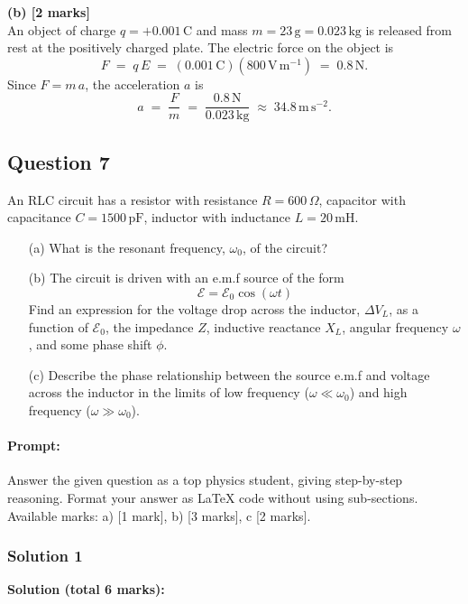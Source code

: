 \documentclass{article}
\begin{document}
\textbf{(b) [2 marks]}\\
An object of charge \(q = +0.001\,\mathrm{C}\) and mass \(m = 23\,\mathrm{g} 
= 0.023\,\mathrm{kg}\) is released from rest at the positively charged plate.  
The electric force on the object is
\[
F \;=\; q\,E \;=\; (0.001\,\mathrm{C})(800\,\mathrm{V\,m^{-1}}) 
\;=\; 0.8\,\mathrm{N}.
\]
Since \(F = m\,a\), the acceleration \(a\) is
\[
a \;=\; \frac{F}{m} \;=\; \frac{0.8\,\mathrm{N}}{0.023\,\mathrm{kg}}
\;\approx\; 34.8\,\mathrm{m\,s^{-2}}.
\]


\subsection{Question 7}
An RLC circuit has a resistor with resistance $R = 600\,\Omega$, capacitor with capacitance $C = 1500\,\mathrm{pF}$, inductor with inductance $L = 20\,\mathrm{mH}$.  

\begin{enumerate}
    \item[(a)] What is the resonant frequency, $\omega_0$, of the circuit?  

    \item[(b)] The circuit is driven with an e.m.f source of the form  
    \[
    \mathcal{E} = \mathcal{E}_0 \cos(\omega t)
    \]  
    Find an expression for the voltage drop across the inductor, $\Delta V_L$, as a function of $\mathcal{E}_0$, the impedance $Z$, inductive reactance $X_L$, angular frequency $\omega$, and some phase shift $\phi$.  

    \item[(c)] Describe the phase relationship between the source e.m.f and voltage across the inductor in the limits of low frequency ($\omega \ll \omega_0$) and high frequency ($\omega \gg \omega_0$).
\end{enumerate}


\paragraph{Prompt: \\} 
Answer the given question as a top physics student, giving step-by-step reasoning. Format your answer as LaTeX code without using sub-sections. Available marks: a) [1 mark], b) [3 marks], c [2 marks].

\subsubsection{Solution 1}
\textbf{Solution (total 6 marks):}
\end{document}
